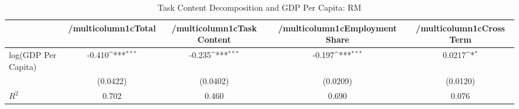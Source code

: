 \begin{table}[htbp]\centering
\def\sym#1{\ifmmode^{#1}\else\(^{#1}\)\fi}
\caption{Task Content Decomposition and GDP Per Capita: RM}
\begin{tabular}{l*{4}{c}}
\hline\hline
            &/multicolumn{1}{c}{Total}&/multicolumn{1}{c}{Task Content}&/multicolumn{1}{c}{Employment Share}&/multicolumn{1}{c}{Cross Term}\\
\hline
log(GDP Per Capita)&      -0.410\sym{***}&      -0.235\sym{***}&      -0.197\sym{***}&      0.0217\sym{*}  \\
            &    (0.0422)         &    (0.0402)         &    (0.0209)         &    (0.0120)         \\

\(R^{2}\)   &       0.702         &       0.460         &       0.690         &       0.076         \\
\hline\hline
\end{tabular}
\end{table}
